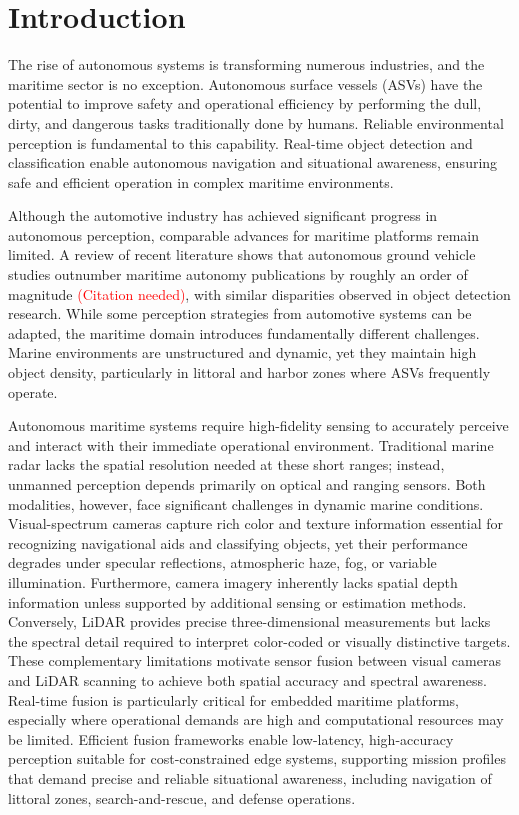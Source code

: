 \documentclass[../main.tex]{subfiles}
\begin{document}
\chapter{Introduction} \label{ch:introduction}

The rise of autonomous systems is transforming numerous industries, and the maritime sector is no exception. Autonomous surface vessels (\acp{ASV}) have the potential to improve safety and operational efficiency by performing the dull, dirty, and dangerous tasks traditionally done by humans.
Reliable environmental perception is fundamental to this capability. 
Real-time object detection and classification enable autonomous navigation and situational awareness, ensuring safe and efficient operation in complex maritime environments.

Although the automotive industry has achieved significant progress in autonomous perception, comparable advances for maritime platforms remain limited. 
A review of recent literature shows that autonomous ground vehicle studies outnumber maritime autonomy publications by roughly an order of magnitude \textcolor{red}{(Citation needed)}, with similar disparities observed in object detection research. 
While some perception strategies from automotive systems can be adapted, the maritime domain introduces fundamentally different challenges. 
Marine environments are unstructured and dynamic, yet they maintain high object density, particularly in littoral and harbor zones where \acp{ASV} frequently operate.

Autonomous maritime systems require high-fidelity sensing to accurately perceive and interact with their immediate operational environment.
Traditional marine radar lacks the spatial resolution needed at these short ranges; instead, unmanned perception depends primarily on optical and ranging sensors.
Both modalities, however, face significant challenges in dynamic marine conditions.
Visual-spectrum cameras capture rich color and texture information essential for recognizing navigational aids and classifying objects, yet their performance degrades under specular reflections, atmospheric haze, fog, or variable illumination.
Furthermore, camera imagery inherently lacks spatial depth information unless supported by additional sensing or estimation methods.
Conversely, \ac{LiDAR} provides precise three-dimensional measurements but lacks the spectral detail required to interpret color-coded or visually distinctive targets.
These complementary limitations motivate sensor fusion between visual cameras and \ac{LiDAR} scanning to achieve both spatial accuracy and spectral awareness.
Real-time fusion is particularly critical for embedded maritime platforms, especially where operational demands are high and computational resources may be limited.
Efficient fusion frameworks enable low-latency, high-accuracy perception suitable for cost-constrained edge systems, supporting mission profiles that demand precise and reliable situational awareness, including navigation of littoral zones, search-and-rescue, and defense operations.
\end{document}
